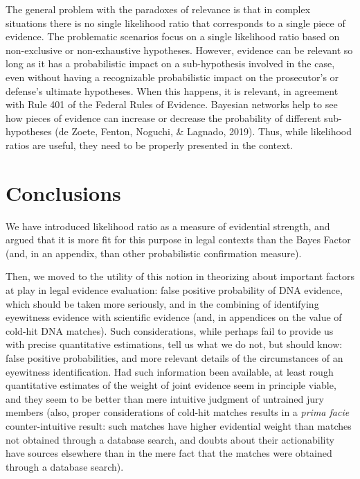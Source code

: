 \documentclass[
  10pt,
  dvipsnames,enabledeprecatedfontcommands]{scrartcl}
\newcommand{\mar}[1]{\todo[color=blue!40]{#1}}
\begin{document}
The general problem with the paradoxes of relevance is that in complex
situations there is no single likelihood ratio that corresponds to a
single piece of evidence. The problematic scenarios focus on a single
likelihood ratio based on non-exclusive or non-exhaustive hypotheses.
However, evidence can be relevant so long as it has a probabilistic
impact on a sub-hypothesis involved in the case, even without having a
recognizable probabilistic impact on the prosecutor's or defense's
ultimate hypotheses. When this happens, it is relevant, in agreement
with Rule 401 of the Federal Rules of Evidence. Bayesian networks help
to see how pieces of evidence can increase or decrease the probability
of different sub-hypotheses (de Zoete, Fenton, Noguchi, \& Lagnado,
2019). Thus, while likelihood ratios are useful, they need to be
properly presented in the context.

\section{Conclusions}

We have introduced likelihood ratio as a measure of evidential strength,
and argued that it is more fit for this purpose in legal contexts than
the Bayes Factor (and, in an appendix, than other probabilistic
confirmation measure).

Then, we moved to the utility of this notion in theorizing about
important factors at play in legal evidence evaluation: false positive
probability of DNA evidence, which should be taken more seriously, and
in the combining of identifying eyewitness evidence with scientific
evidence (and, in appendices on the value of cold-hit DNA matches). Such
considerations, while perhaps fail to provide us with precise
quantitative estimations, tell us what we do not, but should know: false
positive probabilities, and more relevant details of the circumstances
of an eyewitness identification. Had such information been available, at
least rough quantitative estimates of the weight of joint evidence seem
in principle viable, and they seem to be better than mere intuitive
judgment of untrained jury members (also, proper considerations of
cold-hit matches results in a \emph{prima facie} counter-intuitive
result: such matches have higher evidential weight than matches not
obtained through a database search, and doubts about their actionability
have sources elsewhere than in the mere fact that the matches were
obtained through a database search).

\mar{R: revised this in light of Sophie's comments.}
\end{document}
